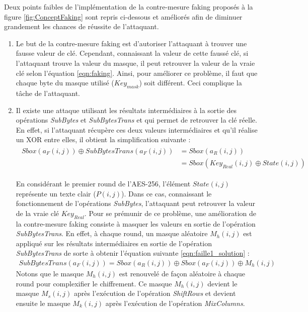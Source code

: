 \documentclass[oneside]{book}
\begin{document}
Deux points faibles de l'implémentation de la contre-mesure faking proposés à la figure \ref{fig:ConceptFaking} sont repris ci-dessous et améliorés afin de diminuer grandement les chances de réussite de l'attaquant.
\begin{enumerate}
\item Le but de la contre-mesure faking est d'autoriser l'attaquant à trouver une fausse valeur de clé. Cependant, connaissant la valeur de cette faussé clé, si l'attaquant trouve la valeur du masque, il peut retrouver la valeur de la vraie clé selon l'équation \ref{eqn:faking}. Ainsi, pour améliorer ce problème, il faut que chaque byte du masque utilisé ($Key_{mask}$) soit différent. Ceci complique la tâche de l'attaquant.
\item Il existe une attaque utilisant les résultats intermédiaires à la sortie des opérations \textit{SubBytes} et \textit{SubBytesTrans} et qui permet de retrouver la clé réelle. En effet, si l'attaquant récupère ces deux valeurs intermédiaires et qu'il réalise un XOR entre elles, il obtient la simplification suivante : 
\begin{gather}
\begin{align*}
        Sbox(a_{F}(i,j)) \oplus SubBytesTrans(a_{F}(i,j)) &= Sbox(a_{R}(i,j))  \\
            &=Sbox(Key_{Real}(i,j) \oplus State(i,j))  
\end{align*}
\label{eqn:faille1}
\end{gather}

En considérant le premier round de l'AES-256, l'élément $State(i,j)$ représente un texte clair ($P(i,j)$). Dans ce cas, connaissant le fonctionnement de l'opérations \textit{SubBytes}, l'attaquant peut retrouver la valeur de la vraie clé $Key_{Real}$. Pour se prémunir de ce problème, une amélioration de la contre-mesure faking consiste à masquer les valeurs en sortie de l'opération \textit{SubBytesTrans}. En effet, à chaque round, un masque aléatoire $M_{h}(i,j)$ est appliqué sur les résultats intermédiaires en sortie de l'opération \textit{SubBytesTrans} de sorte à obtenir l'équation suivante \ref{eqn:faille1_solution} : 
\begin{gather}
	SubBytesTrans(a_{F}(i,j)) = Sbox(a_{R}(i,j))  \oplus Sbox(a_{F}(i,j)) \oplus M_{h}(i,j) \label{eqn:faille1_solution}
\end{gather}
Notons que le masque $M_{h}(i,j)$ est renouvelé de façon aléatoire à chaque round pour complexifier le chiffrement. Ce masque $M_{h}(i,j)$ devient le masque $M_{s}(i,j)$ après l'exécution de l'opération \textit{ShiftRows} et devient ensuite le masque $M_{k}(i,j)$ après l'exécution de l'opération \textit{MixColumns}.
\end{enumerate}
\end{document}
